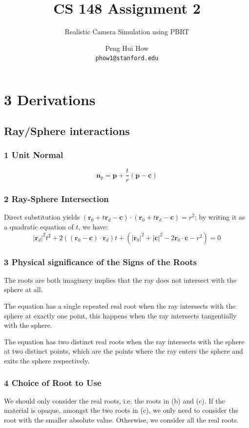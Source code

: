 \documentclass[10pt,letter]{scrartcl}
\newcommand{\ctr}{\mathbf{c}} %
\newcommand{\pt}{\mathbf{p}} %
\newcommand{\n}{\mathbf{n}} %
\newcommand{\ray}{\mathbf{r}} %
\theoremstyle{definition} %
\begin{document}
\title{CS 148 Assignment 2}
\subtitle{Realistic Camera Simulation using PBRT}
\author{Peng Hui How\\\texttt{phow1@stanford.edu}}
\maketitle
\section*{3 Derivations}
\subsection*{Ray/Sphere interactions}
\subsubsection*{1 Unit Normal}%
\begin{equation}
\n_p = \pt + \frac{t}{r}(\pt - \ctr)
\end{equation}
\subsubsection*{2 Ray-Sphere Intersection}%
Direct substitution yields $(\ray_0 + t\ray_d - \ctr) \cdot (\ray_0 + t\ray_d - \ctr) = r^2$; by writing it as a quadratic equation of $t$, we have:
\begin{equation}
|\ray_d|^2t^2 + 2((\ray_0 - \ctr) \cdot \ray_d)t + (|\ray_0|^2 + |\ctr|^2 - 2\ray_0 \cdot \ctr - r^2) = 0
\end{equation}
\subsubsection*{3 Physical significance of the Signs of the Roots}%
\begin{compactenum}[(a)]
\item The roots are both imaginery implies that the ray does not intersect with the sphere at all.
\item The equation has a single repeated real root when the ray intersects with the sphere at exactly one point, this happens when the ray intersects tangentially with the sphere.
\item The equation has two distinct real roots when the ray intersects with the sphere at two distinct points, which are the points where the ray enters the sphere and exits the sphere respectively.
\end{compactenum}
\subsubsection*{4 Choice of Root to Use}%
We should only consider the real roots, i.e. the roots in (b) and (c). If the material is opaque, amongst the two roots in (c), we only need to consider the root with the smaller absolute value. Otherwise, we consider all the real roots.
\end{document}
